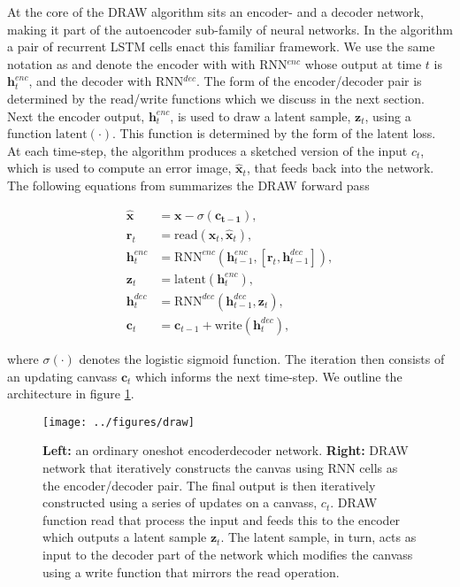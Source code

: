 \noindent At the core of the DRAW algorithm sits an encoder- and a decoder network, making it part of the autoencoder sub-family of neural networks. In the algorithm a pair of recurrent LSTM cells enact this familiar framework. We use the same notation as \citet{Gregor2015} and denote the encoder with with RNN${}^{enc}$ whose output at time $t$ is $\boldsymbol{h}_t^{enc}$, and the decoder with RNN${}^{dec}$. The form of the encoder/decoder pair is determined by the read/write functions which we discuss in the next section. Next the encoder output, $\boldsymbol{h}_t^{enc}$, is used to draw a latent sample, $\boldsymbol{z}_t$, using a function $\text{latent}(\cdot)$. This function is determined by the form of the latent loss. At each time-step, the algorithm produces a sketched version of the input $c_t$, which is used to compute an error image, $\hat{\boldsymbol{x}}_t$, that feeds back into the network. The following equations from \citet{Gregor2015} summarizes the DRAW forward pass

\begin{align}
\hat{\boldsymbol{x}} &= \boldsymbol{x} - \sigma(\boldsymbol{c_{t-1}}), \\
\boldsymbol{r}_t &= \text{read}(\boldsymbol{x}_t, \hat{\boldsymbol{x}}_t ), \\
\boldsymbol{h}^{enc}_t &= \text{RNN}^{enc}( \boldsymbol{h}^{enc}_{t-1}, [\boldsymbol{r}_t, \boldsymbol{h}^{dec}_{t-1}]),\\
\boldsymbol{z}_t &= \text{latent}(\boldsymbol{h}^{enc}_t),\\
\boldsymbol{h}^{dec}_t &= \text{RNN}^{dec}( \boldsymbol{h}^{dec}_{t-1}, \boldsymbol{z}_t),\\
\boldsymbol{c}_t &= \boldsymbol{c}_{t-1} + \text{write}(\boldsymbol{h}_t^{dec}) \label{eq:draw},
\end{align} 

 \noindent where $\sigma(\cdot)$ denotes the logistic sigmoid function. The iteration then consists of an updating canvass $\boldsymbol{c}_t$ which informs the next time-step. We outline the architecture in figure \ref{fig:draw}.

\begin{figure}[h]
\centering
\texttt{[image: ../figures/draw]}
\caption[DRAW network architecture]{\textbf{Left:} an ordinary one\-shot encoder\-decoder network. \textbf{Right:} DRAW network that iteratively constructs the canvas using RNN cells as the encoder/decoder pair. The final output is then iteratively constructed using a series of updates on a canvass, $c_t$. DRAW function read that process the input and feeds this to the encoder which outputs a latent sample $\boldsymbol{z}_t$. The latent sample, in turn, acts as input to the decoder part of the network which modifies the canvass using a write function that mirrors the read operation.}\label{fig:draw}
\end{figure}
 
